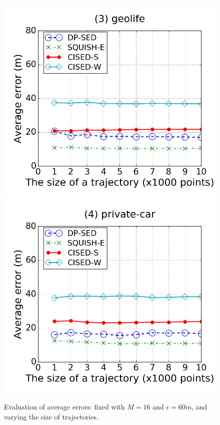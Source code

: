 \begin{figure}[tb!]
\includegraphics[scale = 0.250]{figures/Exp-error-size-geolife.png}
\includegraphics[scale = 0.250]{figures/Exp-error-size-private.png}
\vspace{-2ex}
\caption{\small Evaluation of average errors: fixed with $M=16$ and $\epsilon=60m$, and varying the size of trajectories.}
\label{fig:ae-size}
\vspace{-2ex}
\end{figure}


